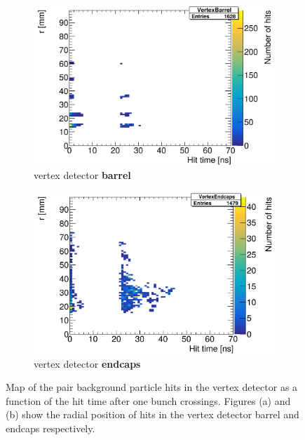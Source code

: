   \begin{figure}[htbp]
 \centering
  \begin{subfigure}[b]{0.49\textwidth}
   \centering
    \includegraphics[width=\textwidth]{Figures/Pairs/hittime_SiVertexBarrel.png}
   \caption{\sid vertex detector \textbf{barrel}}
   \end{subfigure}
   \hfill
    \begin{subfigure}[b]{0.49\textwidth}
   \centering
    \includegraphics[width=\textwidth]{Figures/Pairs/hittime_SiVertexEndcap.png}
   \caption{\sid vertex detector \textbf{endcaps}}
   \end{subfigure}
   \caption[Pair background hit time maps in the \sid vertex detector]{Map of the pair background particle hits in the \sid vertex detector as a function of the hit time after one bunch crossings.
   Figures (a) and (b) show the radial position of hits in the vertex detector barrel and endcaps respectively.
   }
   \label{fig:PairBkg:Hittime}
 \end{figure}
 
